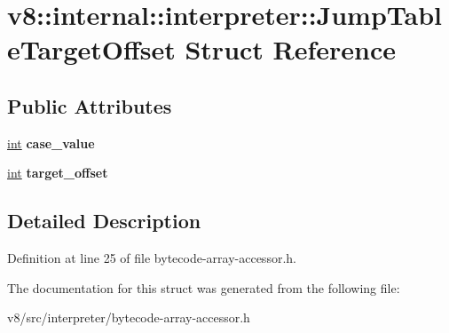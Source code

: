 \hypertarget{structv8_1_1internal_1_1interpreter_1_1JumpTableTargetOffset}{}\section{v8\+:\+:internal\+:\+:interpreter\+:\+:Jump\+Table\+Target\+Offset Struct Reference}
\label{structv8_1_1internal_1_1interpreter_1_1JumpTableTargetOffset}
\subsection*{Public Attributes}
\begin{DoxyCompactItemize}
\item 
\mbox{\label{structv8_1_1internal_1_1interpreter_1_1JumpTableTargetOffset_af95da56119f39abeb8ebd27c5edf6ba4}} 
\mbox{\hyperlink{classint}{int}} {\bfseries case\+\_\+value}
\item 
\mbox{\label{structv8_1_1internal_1_1interpreter_1_1JumpTableTargetOffset_a4bbfe66e2a9b6fe0b1abf8dbcf59bc73}} 
\mbox{\hyperlink{classint}{int}} {\bfseries target\+\_\+offset}
\end{DoxyCompactItemize}


\subsection{Detailed Description}


Definition at line 25 of file bytecode-\/array-\/accessor.\+h.



The documentation for this struct was generated from the following file\+:\begin{DoxyCompactItemize}
\item 
v8/src/interpreter/bytecode-\/array-\/accessor.\+h\end{DoxyCompactItemize}
